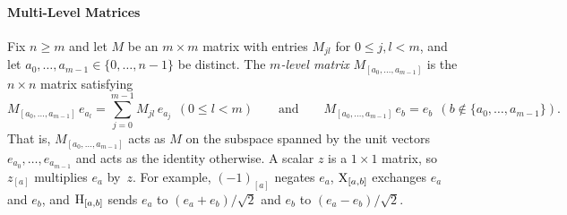 \documentclass[acmsmall,screen,nonacm]{acmart}
\begin{document}
\paragraph{Multi-Level Matrices}\cite[Definition~3.7]{amy2020numbertheoretic} Fix $n\geq m$ and let $M$ be an $m\times m$ matrix with entries $M_{jl}$ for $0\le j,l<m$, and let $a_0,\dots,a_{m-1}\in\{0,\dots,n-1\}$ be distinct. The \emph{$m$-level matrix} $M_{[a_0,\dots,a_{m-1}]}$ is the $n\times n$ matrix satisfying 
\[
M_{[a_0,\dots,a_{m-1}]}\,e_{a_l}=\sum_{j=0}^{m-1}M_{jl}\,e_{a_j}\ \ (0\le l<m)
\qquad\text{and}\qquad
M_{[a_0,\dots,a_{m-1}]}\,e_b=e_b\ \ (b\notin\{a_0,\dots,a_{m-1}\}).
\]
That is, $M_{[a_0,\dots,a_{m-1}]}$ acts as $M$ on the subspace spanned by the unit vectors $e_{a_0},\ldots, e_{a_{m-1}}$ and acts as the identity otherwise.
A scalar $z$ is a $1\times1$ matrix, so $z_{[a]}$ multiplies $e_a$ by~$z$. For example, $(-1)_{[a]}$ negates $e_a$, $\mathrm{X}_{[a,b]}$ exchanges $e_a$ and $e_b$, and $\mathrm{H}_{[a,b]}$ sends $e_a$ to $(e_a+e_b)/\sqrt2$ and $e_b$ to $(e_a-e_b)/\sqrt2$. 


\end{document}
